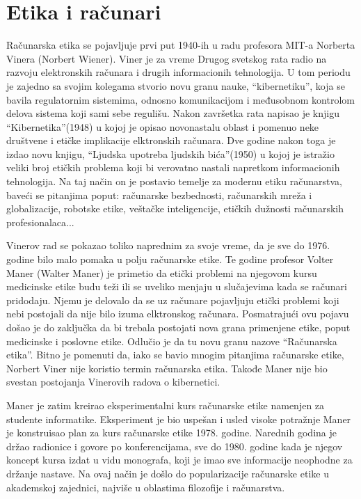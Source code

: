 \documentclass[a4paper]{article}
\begin{document}
\section{Etika i računari}

Računarska etika se pojavljuje prvi put 1940-ih u radu profesora MIT-a
Norberta Vinera (Norbert Wiener)\cite{bynum}. Viner je za vreme Drugog svetskog rata radio na razvoju elektronskih računara i drugih informacionih tehnologija. U tom periodu je zajedno sa svojim kolegama stvorio novu granu nauke, ``kibernetiku'', koja se bavila regulatornim sistemima, odnosno komunikacijom i međusobnom kontrolom delova sistema koji sami sebe regulišu.
Nakon završetka rata napisao je knjigu ``Kibernetika''(1948) u kojoj je opisao novonastalu oblast i pomenuo neke društvene i etičke implikacije elktronskih računara. Dve godine nakon toga je izdao novu knjigu, ``Ljudska upotreba ljudskih bića''(1950) u kojoj je istražio veliki broj etičkih problema koji bi verovatno nastali napretkom informacionih tehnologija. Na taj način on je postavio temelje za modernu etiku računarstva, baveći se pitanjima poput: računarske bezbednosti, računarskih mreža i globalizacije, robotske etike, veštačke inteligencije, etičkih dužnosti računarskih profesionalaca...

Vinerov rad se pokazao toliko naprednim za svoje vreme, da je sve do 1976. godine bilo malo pomaka u polju računarske etike. Te godine profesor Volter Maner (Walter Maner) je primetio da etički problemi na njegovom kursu medicinske etike budu teži ili se uveliko menjaju u slučajevima kada se računari pridodaju. Njemu je delovalo da se uz računare pojavljuju etički problemi koji nebi postojali da nije bilo izuma elktronskog računara. Posmatrajući ovu pojavu došao je do zaključka da bi trebala postojati nova grana primenjene etike, poput medicinske i poslovne etike. Odlučio je da tu novu granu nazove ``Računarska etika''. Bitno je pomenuti da, iako se bavio mnogim pitanjima računarske etike, Norbert Viner nije koristio termin računarska etika. Takođe Maner nije bio svestan postojanja Vinerovih radova o kibernetici.

Maner je zatim kreirao eksperimentalni kurs računarske etike namenjen za studente informatike. Eksperiment je bio uspešan i usled visoke potražnje Maner je konstruisao plan za kurs računarske etike 1978. godine. Narednih godina je držao radionice i govore po konferencijama, sve do 1980. godine kada je njegov koncept kursa izdat u vidu monografa, koji je imao sve informacije neophodne za držanje nastave. Na ovaj način je došlo do popularizacije računarske etike u akademskoj zajednici, najviše u oblastima filozofije i računarstva.
\end{document}

